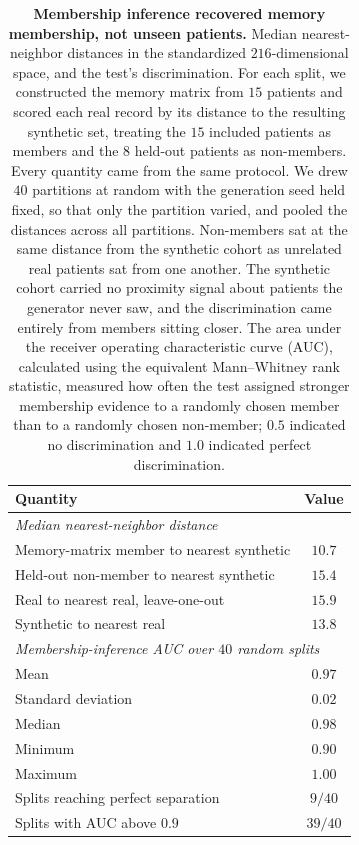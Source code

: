 \begin{table}[ht]
\centering
\caption{\textbf{Membership inference recovered memory membership, not unseen
patients.} Median nearest-neighbor distances in the standardized $216$-dimensional space,
and the test's discrimination. For each split, we constructed the memory matrix from $15$
patients and scored each real record by its distance to the resulting synthetic set,
treating the $15$ included patients as members and the $8$ held-out patients as
non-members. Every quantity came from the same protocol. We drew $40$ partitions at random
with the generation seed held fixed, so that only the partition varied, and pooled the
distances across all partitions. Non-members sat at the same distance from the synthetic
cohort as unrelated real patients sat from one another. The synthetic cohort
carried no proximity signal about patients the generator never saw, and the discrimination
came entirely from members sitting closer. The area under the receiver operating
characteristic curve (AUC), calculated using the equivalent Mann--Whitney rank statistic,
measured how often the test assigned stronger membership evidence to a randomly chosen member
than to a randomly chosen non-member; $0.5$ indicated no discrimination and $1.0$ indicated
perfect discrimination.}
\label{stab:membership}
\begin{tabular}{lc}
\toprule
Quantity & Value \\
\midrule
\multicolumn{2}{l}{\emph{Median nearest-neighbor distance}} \\
Memory-matrix member to nearest synthetic      & $10.7$ \\
Held-out non-member to nearest synthetic       & $15.4$ \\
Real to nearest real, leave-one-out            & $15.9$ \\
Synthetic to nearest real                      & $13.8$ \\
\midrule
\multicolumn{2}{l}{\emph{Membership-inference AUC over $40$ random splits}} \\
Mean                                           & $0.97$ \\
Standard deviation                             & $0.02$ \\
Median                                         & $0.98$ \\
Minimum                                        & $0.90$ \\
Maximum                                        & $1.00$ \\
Splits reaching perfect separation             & $9/40$ \\
Splits with AUC above $0.9$                    & $39/40$ \\
\bottomrule
\end{tabular}
\end{table}

